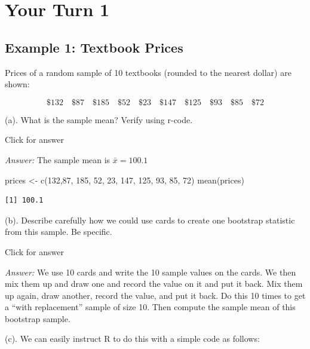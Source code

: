 \documentclass[
]{book}
\newenvironment{Shaded}{\begin{snugshade}}{\end{snugshade}}
\newcommand{\DecValTok}[1]{\textcolor[rgb]{0.00,0.00,0.81}{#1}}
\newcommand{\FunctionTok}[1]{\textcolor[rgb]{0.00,0.00,0.00}{#1}}
\newcommand{\NormalTok}[1]{#1}
\newcommand{\OtherTok}[1]{\textcolor[rgb]{0.56,0.35,0.01}{#1}}
\begin{document}
\hypertarget{your-turn-1-6}{%
\section{Your Turn 1}\label{your-turn-1-6}}

\hypertarget{example-1-textbook-prices}{%
\subsection{Example 1: Textbook Prices}\label{example-1-textbook-prices}}

Prices of a random sample of 10 textbooks (rounded to the nearest dollar) are shown:

\[ \$132 \quad \$87 \quad \$185 \quad \$52 \quad \$23 \quad \$147 \quad \$125 \quad \$93 \quad \$85 \quad \$72 \]

(a). What is the sample mean? Verify using r-code.

Click for answer

\emph{Answer:} The sample mean is \(\bar{x} = 100.1\)

\begin{Shaded}
\begin{Highlighting}[]
\NormalTok{prices }\OtherTok{\textless{}{-}} \FunctionTok{c}\NormalTok{(}\DecValTok{132}\NormalTok{,}\DecValTok{87}\NormalTok{, }\DecValTok{185}\NormalTok{, }\DecValTok{52}\NormalTok{, }\DecValTok{23}\NormalTok{, }\DecValTok{147}\NormalTok{, }\DecValTok{125}\NormalTok{, }\DecValTok{93}\NormalTok{, }\DecValTok{85}\NormalTok{, }\DecValTok{72}\NormalTok{)}
\FunctionTok{mean}\NormalTok{(prices)}
\end{Highlighting}
\end{Shaded}

\begin{verbatim}
[1] 100.1
\end{verbatim}

(b). Describe carefully how we could use cards to create one bootstrap statistic from this sample. Be specific.

Click for answer

\emph{Answer:} We use 10 cards and write the 10 sample values on the cards. We then mix them up and draw one and record the value on it and put it back. Mix them up again, draw another, record the value, and put it back. Do this 10 times to get a ``with replacement'' sample of size 10. Then compute the sample mean of this bootstrap sample.

(c). We can easily instruct R to do this with a simple code as follows:
\end{document}
